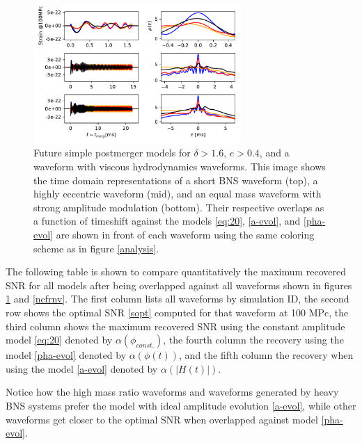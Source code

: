 \begin{figure}[hbt!]
\begin{center}
\includegraphics[width=0.7\textwidth, angle=0]{images/Data_analysis/results/phi-A2.pdf}
\captionsetup{width=0.8\textwidth}
\caption[Future simple postmerger models for $\delta>1.6$, $e>0.4$, and a waveform with viscous hydrodynamics waveforms]{Future simple postmerger models for $\delta>1.6$, $e>0.4$, and a waveform with viscous hydrodynamics waveforms. This image shows the time domain representations of a short BNS waveform (top), a highly eccentric waveform (mid), and an equal mass waveform with strong amplitude modulation (bottom). Their respective overlaps as a function of timeshift against the models \ref{eq:20}, \ref{a-evol}, and \ref{pha-evol} are shown in front of each waveform using the same coloring scheme as in figure \ref{analysis}.}
\label{ncejn}
\end{center}
\end{figure}
\FloatBarrier


The following table is shown to compare quantitatively the maximum recovered SNR for all models after being overlapped against all waveforms shown in figures \ref{ncejn} and \ref{ncfrnv}. The first column lists all waveforms by simulation ID, the second row shows the optimal SNR \ref{sopt} computed for that waveform at 100 MPc, the third column shows the maximum recovered SNR using the constant amplitude model \ref{eq:20} denoted by $\alpha(\phi_{const.})$, the fourth column the recovery using the model \ref{pha-evol} denoted by $\alpha(\phi(t))$, and the fifth column the recovery when using the model \ref{a-evol} denoted by $\alpha(|H(t)|)$.

Notice how the high mass ratio waveforms and waveforms generated by heavy BNS systems prefer the model with ideal amplitude evolution \ref{a-evol}, while other waveforms get closer to the optimal SNR when overlapped against model \ref{pha-evol}.


